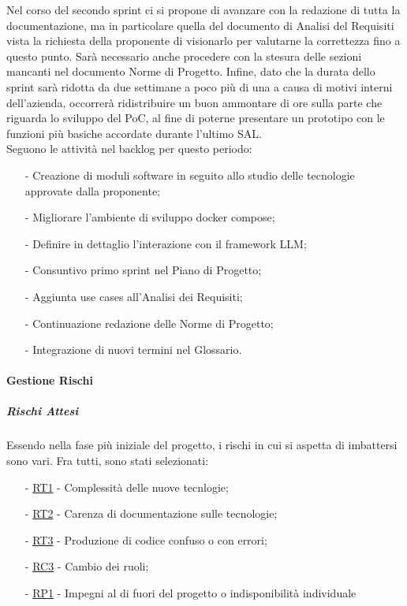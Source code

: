 \documentclass[10pt]{article}
\begin{document}
{{{    Nel corso del secondo sprint ci si propone di avanzare con la redazione di tutta la documentazione, ma in particolare quella del documento di Analisi del Requisiti vista la richiesta della proponente di visionarlo per valutarne la correttezza fino a questo punto. Sarà necessario anche procedere con la stesura delle sezioni mancanti nel documento Norme di Progetto. Infine, dato che la durata dello sprint sarà ridotta da due settimane a poco più di una a causa di motivi interni dell'azienda, occorrerà ridistribuire un buon ammontare di ore sulla parte che riguarda lo sviluppo del PoC, al fine di poterne presentare un prototipo con le funzioni più basiche accordate durante l'ultimo SAL.\\
    Seguono le attività nel backlog per questo periodo:
    \vspace{-0.5em}
    \begin{itemize}
    \setlength\itemsep{-0.2em}
    \item [-] Creazione di moduli software in seguito allo studio delle tecnologie approvate dalla proponente;
    \item [-] Migliorare l'ambiente di sviluppo docker compose; 
    \item [-] Definire in dettaglio l'interazione con il framework LLM;
    \item [-] Consuntivo primo sprint nel Piano di Progetto;
    \item [-] Aggiunta use cases all'Analisi dei Requisiti;
    \item [-] Continuazione redazione delle Norme di Progetto;
    \item [-] Integrazione di nuovi termini nel Glossario.
    \end{itemize}

    \paragraph{Gestione Rischi}\mbox{}
    \vspace{-1em}
    \subparagraph*{Rischi Attesi}\mbox{}
    
    Essendo nella fase più iniziale del progetto, i rischi in cui si aspetta di imbattersi sono vari. Fra tutti, sono stati selezionati:
    \vspace{-0.5em}
    \begin{itemize}
    \setlength\itemsep{-0.2em}
    \item [-] \hyperref[RT1]{RT1} - Complessità delle nuove tecnlogie;
    \item [-] \hyperref[RT2]{RT2} - Carenza di documentazione sulle tecnologie;
    \item [-] \hyperref[RT3]{RT3} - Produzione di codice confuso o con errori;
    \item [-] \hyperref[RC3]{RC3} - Cambio dei ruoli;
    \item [-] \hyperref[RP1]{RP1} - Impegni al di fuori del progetto o indisponibilità individuale
    \end{itemize}

}}}
\end{document}
